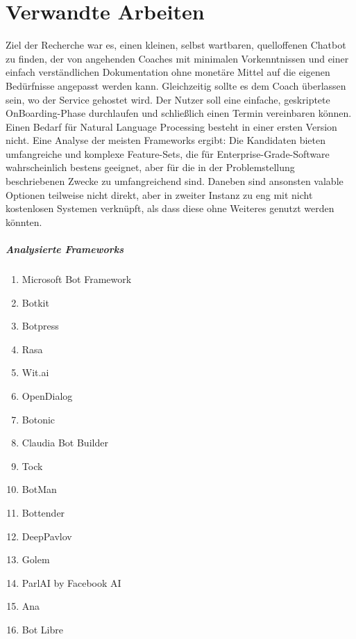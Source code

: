 \label{Verwandte Arbeiten}
\chapter{Verwandte Arbeiten}

    Ziel der Recherche war es, einen kleinen, selbst wartbaren, quelloffenen Chatbot zu finden, der von angehenden Coaches mit minimalen Vorkenntnissen und einer einfach verständlichen Dokumentation ohne monetäre Mittel auf die eigenen Bedürfnisse angepasst werden kann. Gleichzeitig sollte es dem Coach überlassen sein, wo der Service gehostet wird. Der Nutzer soll eine einfache, geskriptete OnBoarding-Phase durchlaufen und schließlich einen Termin vereinbaren können. Einen Bedarf für Natural Language Processing besteht in einer ersten Version nicht. Eine Analyse der meisten Frameworks ergibt: Die Kandidaten bieten umfangreiche und komplexe Feature-Sets, die für Enterprise-Grade-Software wahrscheinlich bestens geeignet, aber für die in der Problemstellung beschriebenen Zwecke zu umfangreichend sind. Daneben sind ansonsten valable Optionen teilweise nicht direkt, aber in zweiter Instanz zu eng mit nicht kostenlosen Systemen verknüpft, als dass diese ohne Weiteres genutzt werden könnten. 

    \paragraph{Analysierte Frameworks}
    \begin{enumerate}
        \item Microsoft Bot Framework
        \item Botkit
        \item Botpress
        \item Rasa
        \item Wit.ai
        \item OpenDialog
        \item Botonic
        \item Claudia Bot Builder
        \item Tock
        \item BotMan
        \item Bottender
        \item DeepPavlov
        \item Golem
        \item ParlAI by Facebook AI
        \item Ana
        \item Bot Libre
    \end{enumerate}

